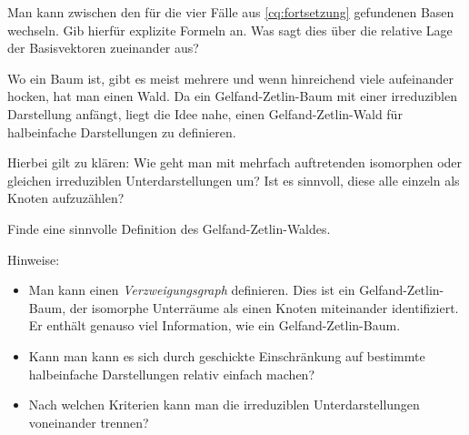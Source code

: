 \begin{sheet}
	\begin{problem}[title={Basiswechsel zwischen verschiedenen Gelfand-Zetlin-Basen}]
			Man kann zwischen den für die vier Fälle aus \ref{cq:fortsetzung} gefundenen Basen wechseln. Gib hierfür explizite Formeln an. Was sagt dies über die relative Lage der Basisvektoren zueinander aus?
	\end{problem}

	\begin{problem}[title={Gelfand-Zetlin-Wald}]
		Wo ein Baum ist, gibt es meist mehrere und wenn hinreichend viele aufeinander hocken, hat man einen Wald. Da ein Gelfand-Zetlin-Baum mit einer irreduziblen Darstellung anfängt, liegt die Idee nahe, einen Gelfand-Zetlin-Wald für halbeinfache Darstellungen zu definieren.
		
		Hierbei gilt zu klären: Wie geht man mit mehrfach auftretenden isomorphen oder gleichen irreduziblen Unterdarstellungen um? Ist es sinnvoll, diese alle einzeln als Knoten aufzuzählen?
		
		Finde eine sinnvolle Definition des Gelfand-Zetlin-Waldes.
		
		Hinweise:
		\begin{itemize}
		 \item Man kann einen \emph{Verzweigungsgraph} definieren. Dies ist ein Gelfand-Zetlin-Baum, der isomorphe Unterräume als einen Knoten miteinander identifiziert. Er enthält genauso viel Information, wie ein Gelfand-Zetlin-Baum.
		\item Kann man kann es sich durch geschickte Einschränkung auf bestimmte halbeinfache Darstellungen relativ einfach machen?
		\item Nach welchen Kriterien kann man die irreduziblen Unterdarstellungen voneinander trennen?
		\end{itemize}
	\end{problem}


\end{sheet}